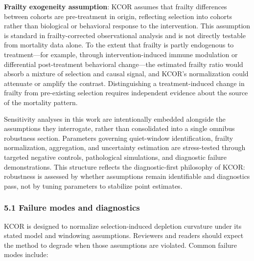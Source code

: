 \documentclass[
]{article}
\begin{document}
\begin{itemize}
  \textbf{Frailty exogeneity assumption}: KCOR assumes that frailty differences between cohorts are pre-treatment in origin, reflecting selection into cohorts rather than biological or behavioral response to the intervention. This assumption is standard in frailty-corrected observational analysis and is not directly testable from mortality data alone. To the extent that frailty is partly endogenous to treatment---for example, through intervention-induced immune modulation or differential post-treatment behavioral change---the estimated frailty ratio would absorb a mixture of selection and causal signal, and KCOR's normalization could attenuate or amplify the contrast. Distinguishing a treatment-induced change in frailty from pre-existing selection requires independent evidence about the source of the mortality pattern.
\end{itemize}

Sensitivity analyses in this work are intentionally embedded alongside the assumptions they interrogate, rather than consolidated into a single omnibus robustness section. Parameters governing quiet-window identification, frailty normalization, aggregation, and uncertainty estimation are stress-tested through targeted negative controls, pathological simulations, and diagnostic failure demonstrations. This structure reflects the diagnostic-first philosophy of KCOR: robustness is assessed by whether assumptions remain identifiable and diagnostics pass, not by tuning parameters to stabilize point estimates.

\subsubsection{5.1 Failure modes and diagnostics}\label{failure-modes-and-diagnostics}

KCOR is designed to normalize selection-induced depletion curvature under its stated model and windowing assumptions. Reviewers and readers should expect the method to degrade when those assumptions are violated. Common failure modes include:
\end{document}
